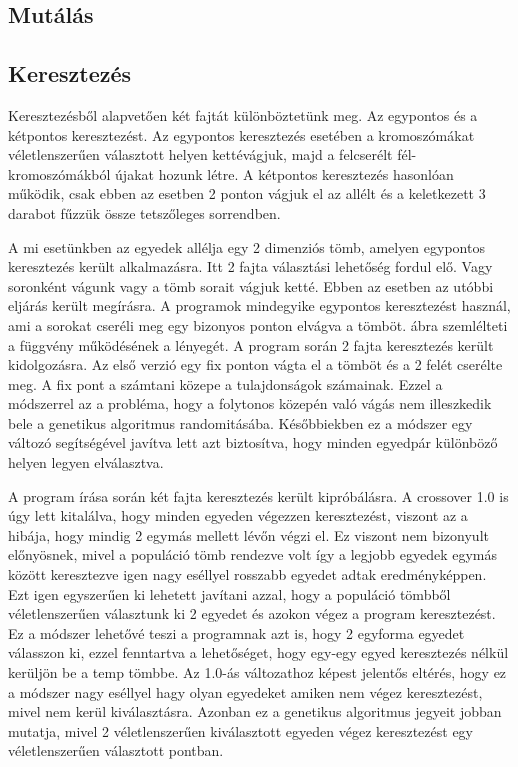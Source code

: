 \documentclass[12ppt,a4paper,oneside]{report}
\begin{document}
        \subsection{Mutálás} %
            
        \subsection{Keresztezés} %
            
            {Keresztezésből alapvetően két fajtát különböztetünk meg. Az egypontos és a kétpontos keresztezést. Az egypontos keresztezés esetében a kromoszómákat véletlenszerűen választott helyen kettévágjuk, majd a felcserélt fél-kromoszómákból újakat hozunk létre.  A kétpontos keresztezés hasonlóan működik, csak ebben az esetben 2 ponton vágjuk el az allélt és a keletkezett 3 darabot fűzzük össze tetszőleges sorrendben.}
                        
            {A mi esetünkben az egyedek allélja egy 2 dimenziós tömb, amelyen egypontos keresztezés került alkalmazásra. Itt 2 fajta választási lehetőség fordul elő. Vagy soronként vágunk vagy a tömb sorait vágjuk ketté. Ebben az esetben az utóbbi eljárás került megírásra. A programok mindegyike egypontos keresztezést használ, ami a sorokat cseréli meg egy bizonyos ponton elvágva a tömböt.  ábra szemlélteti a függvény működésének a lényegét. A program során 2 fajta keresztezés került kidolgozásra. Az első verzió egy fix ponton vágta el a tömböt és a 2 felét cserélte meg. A fix pont a számtani közepe a tulajdonságok számainak. Ezzel a módszerrel az a probléma, hogy a folytonos közepén való vágás nem illeszkedik bele a genetikus algoritmus randomitásába. Későbbiekben ez a módszer egy változó segítségével javítva lett azt biztosítva, hogy minden egyedpár különböző helyen legyen elválasztva.}
            
                     
            {A program írása során két fajta keresztezés került kipróbálásra. A crossover 1.0 is úgy lett kitalálva, hogy minden egyeden végezzen keresztezést, viszont az a hibája, hogy mindig 2 egymás mellett lévőn végzi el. Ez viszont nem bizonyult előnyösnek, mivel a populáció tömb rendezve volt így a legjobb egyedek egymás között keresztezve igen nagy eséllyel rosszabb egyedet adtak eredményképpen. Ezt igen egyszerűen ki lehetett javítani azzal, hogy a populáció tömbből véletlenszerűen választunk ki 2 egyedet és azokon végez a program keresztezést. Ez a módszer lehetővé teszi a programnak azt is, hogy 2 egyforma egyedet válasszon ki, ezzel fenntartva a lehetőséget, hogy egy-egy egyed keresztezés nélkül kerüljön be a temp tömbbe. Az 1.0-ás változathoz képest jelentős eltérés, hogy ez a módszer nagy eséllyel hagy olyan egyedeket amiken nem végez keresztezést, mivel nem kerül kiválasztásra. Azonban ez a genetikus algoritmus jegyeit jobban mutatja, mivel 2 véletlenszerűen kiválasztott egyeden végez keresztezést egy véletlenszerűen választott pontban.}
            
\end{document}
